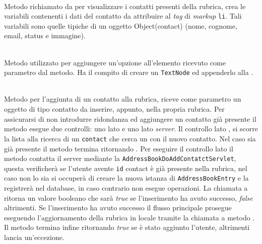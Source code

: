 \begin{description}
	\item{}\\

Metodo richiamato da  per visualizzare i contatti presenti della rubrica, crea le variabili contenenti i dati del contatto da attribuire al \textit{tag} di \textit{markup} \texttt{li}. Tali variabili sono quelle tipiche di un oggetto Object(contact) (nome, cognome, email, status e immagine).


\item{}\\
Metodo utilizzato per aggiungere un'opzione all'elemento  ricevuto come parametro dal metodo. Ha il compito di creare un \texttt{TextNode} ed appenderlo alla .

	
	\item{}\\
	Metodo per l'aggiunta di un contatto alla rubrica, riceve come parametro un oggetto di tipo contatto da inserire, appunto, nella propria rubrica. 
Per assicurarsi di non introdurre ridondanza ed aggiungere un contatto già presente il metodo esegue due controlli: uno lato  e uno lato \textit{server}. 
Il controllo lato , si scorre la lista  alla ricerca di un \texttt{contact} che cerca un  con il nuovo contatto. Nel caso sia già presente il metodo termina ritornando . Per eseguire il controllo lato  il metodo contatta il server mediante la  \texttt{AddressBookDoAddContatctServlet}, questa verificherà se l'utente avente \texttt{id} contact è già presente nella rubrica, nel caso non lo sia si occuperà di creare la nuova istanza di \texttt{AddressBookEntry} e la registrerà nel database, in caso contrario non esegue operazioni. 
La chiamata a  ritorna un valore booleano che sarà \textit{true} se l'inserimento ha avuto successo, \textit{false} altrimenti. 
Se l'inserimento ha avuto successo il flusso principale prosegue eseguendo l'aggiornamento della rubrica in locale tramite la chiamata a metodo . Il metodo termina infine ritornando \textit{true} se è stato aggiunto l'utente, altrimenti lancia un'eccezione.


\end{description}
